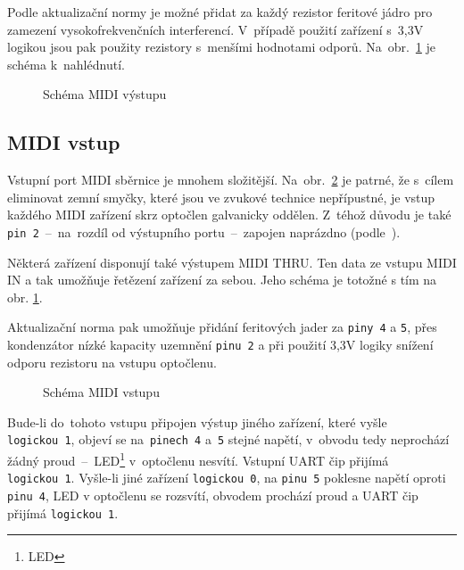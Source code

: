 Podle aktualizační normy \cite{MIDIupd} je možné přidat za každý rezistor feritové jádro pro zamezení vysokofrekvenčních interferencí. V~případě použití zařízení s~3,3\unit{V} logikou jsou pak použity rezistory s~menšími hodnotami odporů. Na~obr.~\ref{fig:schMIDIout} je schéma k~nahlédnutí.

\begin{figure}[h]
    \centering
    
    \caption{Schéma \acs{MIDI} výstupu \cite{MIDIspecs}}
    \label{fig:schMIDIout}
\end{figure}

\subsection{MIDI vstup}



Vstupní port \acs{MIDI} sběrnice je mnohem složitější. Na~obr.~\ref{fig:schMIDIin} je patrné, že s~cílem eliminovat zemní smyčky, které jsou ve zvukové technice nepřípustné, je vstup každého \acs{MIDI} zařízení skrz optočlen galvanicky oddělen. Z~téhož důvodu je také \texttt{pin~2}~--~na~rozdíl od  výstupního portu~--~zapojen naprázdno (podle~\cite{MIDIspecs}). 

Některá zařízení disponují také výstupem \acs{MIDI} THRU. Ten  data ze vstupu \acs{MIDI} IN a tak umožňuje řetězení zařízení za sebou. Jeho schéma je totožné s tím na obr. \ref{fig:schMIDIout}.

Aktualizační norma \cite{MIDIupd} pak umožňuje přidání feritových jader za \texttt{piny~4} a \texttt{5}, přes kondenzátor nízké kapacity uzemnění \texttt{pinu~2} a při použití 3,3\unit{V} logiky snížení odporu rezistoru na vstupu optočlenu.

\begin{figure}[h]
    \centering
    
    \caption{Schéma MIDI vstupu \cite{MIDIspecs}}
    \label{fig:schMIDIin}
\end{figure}

Bude-li do~tohoto vstupu připojen výstup jiného zařízení, které vyšle \linebreak \texttt{logickou~1}, objeví se na~\texttt{pinech~4} a~\texttt{5} stejné napětí, v~obvodu tedy neprochází žádný proud~--~\acs{LED}\footnote{\acl{LED}} v~optočlenu nesvítí. Vstupní UART čip přijímá \texttt{logickou~1}. Vyšle-li jiné zařízení \texttt{logickou~0}, na \texttt{pinu~5} poklesne napětí oproti \texttt{pinu~4}, \acs{LED} v optočlenu se rozsvítí, obvodem prochází proud a UART čip přijímá \texttt{logickou~1}.

